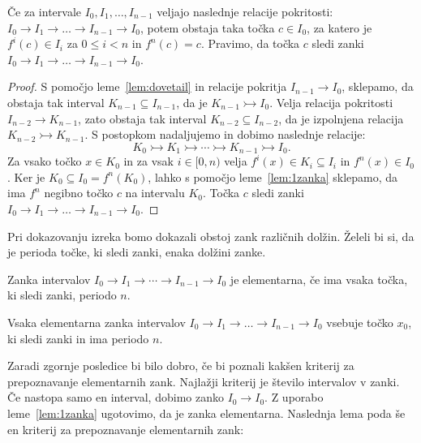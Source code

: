 \documentclass[../TG_magistrsko_delo_sections.tex]{subfiles}
\begin{document}
\begin{lema}\label{lem:zanka}
Če za intervale $I_0, I_1, \dots, I_{n-1}$ veljajo naslednje relacije pokritosti: $I_0 \to I_1 \to \dots \to I_{n-1} \to I_0$, potem obstaja taka točka $c \in I_0$, za katero je $f^{i}(c) \in I_i$ za $0 \leq i < n$ in $f^n(c)=c$. Pravimo, da točka $c$ sledi zanki $I_0 \to I_1 \to \dots \to I_{n-1} \to I_0$.
\end{lema}

\begin{proof}
S pomočjo leme~\ref{lem:dovetail} in relacije pokritja $I_{n-1} \to I_0$, sklepamo, da obstaja tak interval $K_{n-1} \subseteq I_{n-1}$, da je $K_{n-1} \rightarrowtail I_0$. Velja relacija pokritosti $I_{n-2} \to K_{n-1}$, zato obstaja tak interval $K_{n-2} \subseteq I_{n-2}$, da je izpolnjena relacija $K_{n-2} \rightarrowtail K_{n-1}$. S postopkom nadaljujemo in dobimo naslednje relacije:
$$K_0 \rightarrowtail K_1 \rightarrowtail \cdots \rightarrowtail K_{n-1} \rightarrowtail I_0.$$
Za vsako točko $x \in K_0$ in za vsak $i \in [0, n)$ velja $f^i(x) \in K_i \subseteq I_i$ in $f^n(x) \in I_0$. Ker je $K_0 \subseteq I_0 = f^n(K_0)$, lahko s pomočjo leme~\ref{lem:1zanka} sklepamo, da ima $f^n$ negibno točko $c$ na intervalu $K_0$. Točka $c$ sledi zanki $I_0 \to I_1 \to \dots \to I_{n-1} \to I_0$.
\end{proof}

Pri dokazovanju izreka bomo dokazali obstoj zank različnih dolžin. Želeli bi si, da je perioda točke, ki sledi zanki, enaka dolžini zanke. 

\begin{definicija}\label{def:element}
Zanka intervalov $I_0 \to I_1 \to \cdots \to I_{n-1} \to I_0$ je elementarna, če ima vsaka točka, ki sledi zanki, periodo $n$.
\end{definicija}

\begin{posledica}
Vsaka elementarna zanka intervalov $I_0 \to I_1 \to \dots \to I_{n-1} \to I_0$ vsebuje točko $x_0$, ki sledi zanki in ima periodo $n$.
\end{posledica}

Zaradi zgornje posledice bi bilo dobro, če bi poznali kakšen kriterij za prepoznavanje elementarnih zank. Najlažji kriterij je število intervalov v zanki. Če nastopa samo en interval, dobimo zanko $I_0 \to I_0$. Z uporabo leme~\ref{lem:1zanka} ugotovimo, da je zanka elementarna. Naslednja lema poda še en kriterij za prepoznavanje elementarnih zank:
\end{document}
